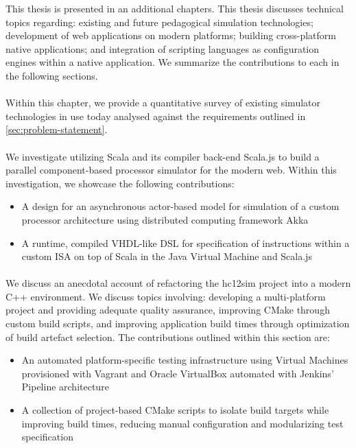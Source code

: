 This thesis is presented in an additional  chapters. This thesis discusses technical topics regarding: existing and future pedagogical simulation technologies; development of web applications on modern platforms; building cross-platform native applications; and integration of scripting languages as configuration engines within a native application. We summarize the contributions to each in the following sections.

\paragraph{} Within this chapter, we provide a quantitative survey of existing simulator technologies in use today analysed against the requirements outlined in \cref{sec:problem-statement}.

\paragraph{} We investigate utilizing Scala and its compiler back-end Scala.js to build a  parallel component-based processor simulator for the modern web. Within this investigation, we showcase the following contributions: 
\begin{itemize}
    \item A design for an asynchronous actor-based model for simulation of a custom processor architecture using distributed computing framework Akka
    \item A runtime, compiled VHDL-like DSL for specification of instructions within a custom ISA on top of Scala in the Java Virtual Machine and Scala.js
\end{itemize}

\paragraph{} We discuss an anecdotal account of refactoring the hc12sim project into a modern C++ environment. We discuss topics involving: developing a multi-platform project and providing adequate quality assurance, improving CMake through custom build scripts, and improving application build times through optimization of build artefact selection. The contributions outlined within this section are: 
\begin{itemize}
    \item An automated platform-specific testing infrastructure using Virtual Machines provisioned with Vagrant and Oracle VirtualBox automated with Jenkins' Pipeline architecture
    \item A collection of project-based CMake scripts to isolate build targets while improving build times, reducing manual configuration and modularizing test specification
\end{itemize}

